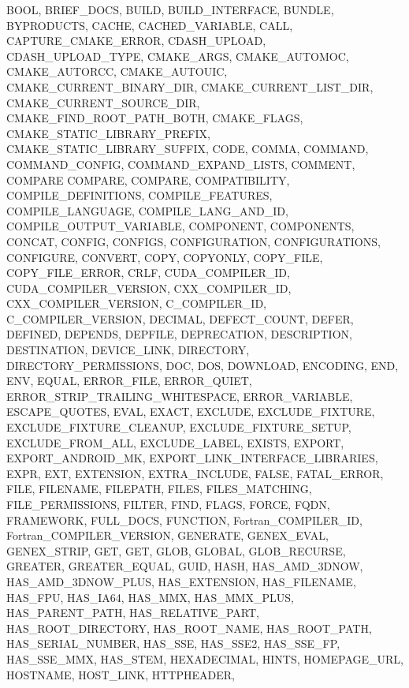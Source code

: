 {{    BOOL,
    BRIEF_DOCS,
    BUILD,
    BUILD_INTERFACE,
    BUNDLE,
    BYPRODUCTS,
    CACHE,
    CACHED_VARIABLE,
    CALL,
    CAPTURE_CMAKE_ERROR,
    CDASH_UPLOAD,
    CDASH_UPLOAD_TYPE,
    CMAKE_ARGS,
    CMAKE_AUTOMOC,
    CMAKE_AUTORCC,
    CMAKE_AUTOUIC,
    CMAKE_CURRENT_BINARY_DIR,
    CMAKE_CURRENT_LIST_DIR,
    CMAKE_CURRENT_SOURCE_DIR,
    CMAKE_FIND_ROOT_PATH_BOTH,
    CMAKE_FLAGS,
    CMAKE_STATIC_LIBRARY_PREFIX,
    CMAKE_STATIC_LIBRARY_SUFFIX,
    CODE,
    COMMA,
    COMMAND,
    COMMAND_CONFIG,
    COMMAND_EXPAND_LISTS,
    COMMENT,
    COMPARE
    COMPARE,
    COMPARE,
    COMPATIBILITY,
    COMPILE_DEFINITIONS,
    COMPILE_FEATURES,
    COMPILE_LANGUAGE,
    COMPILE_LANG_AND_ID,
    COMPILE_OUTPUT_VARIABLE,
    COMPONENT,
    COMPONENTS,
    CONCAT,
    CONFIG,
    CONFIGS,
    CONFIGURATION,
    CONFIGURATIONS,
    CONFIGURE,
    CONVERT,
    COPY,
    COPYONLY,
    COPY_FILE,
    COPY_FILE_ERROR,
    CRLF,
    CUDA_COMPILER_ID,
    CUDA_COMPILER_VERSION,
    CXX_COMPILER_ID,
    CXX_COMPILER_VERSION,
    C_COMPILER_ID,
    C_COMPILER_VERSION,
    DECIMAL,
    DEFECT_COUNT,
    DEFER,
    DEFINED,
    DEPENDS,
    DEPFILE,
    DEPRECATION,
    DESCRIPTION,
    DESTINATION,
    DEVICE_LINK,
    DIRECTORY,
    DIRECTORY_PERMISSIONS,
    DOC,
    DOS,
    DOWNLOAD,
    ENCODING,
    END,
    ENV,
    EQUAL,
    ERROR_FILE,
    ERROR_QUIET,
    ERROR_STRIP_TRAILING_WHITESPACE,
    ERROR_VARIABLE,
    ESCAPE_QUOTES,
    EVAL,
    EXACT,
    EXCLUDE,
    EXCLUDE_FIXTURE,
    EXCLUDE_FIXTURE_CLEANUP,
    EXCLUDE_FIXTURE_SETUP,
    EXCLUDE_FROM_ALL,
    EXCLUDE_LABEL,
    EXISTS,
    EXPORT,
    EXPORT_ANDROID_MK,
    EXPORT_LINK_INTERFACE_LIBRARIES,
    EXPR,
    EXT,
    EXTENSION,
    EXTRA_INCLUDE,
    FALSE,
    FATAL_ERROR,
    FILE,
    FILENAME,
    FILEPATH,
    FILES,
    FILES_MATCHING,
    FILE_PERMISSIONS,
    FILTER,
    FIND,
    FLAGS,
    FORCE,
    FQDN,
    FRAMEWORK,
    FULL_DOCS,
    FUNCTION,
    Fortran_COMPILER_ID,
    Fortran_COMPILER_VERSION,
    GENERATE,
    GENEX_EVAL,
    GENEX_STRIP,
    GET,
    GET,
    GLOB,
    GLOBAL,
    GLOB_RECURSE,
    GREATER,
    GREATER_EQUAL,
    GUID,
    HASH,
    HAS_AMD_3DNOW,
    HAS_AMD_3DNOW_PLUS,
    HAS_EXTENSION,
    HAS_FILENAME,
    HAS_FPU,
    HAS_IA64,
    HAS_MMX,
    HAS_MMX_PLUS,
    HAS_PARENT_PATH,
    HAS_RELATIVE_PART,
    HAS_ROOT_DIRECTORY,
    HAS_ROOT_NAME,
    HAS_ROOT_PATH,
    HAS_SERIAL_NUMBER,
    HAS_SSE,
    HAS_SSE2,
    HAS_SSE_FP,
    HAS_SSE_MMX,
    HAS_STEM,
    HEXADECIMAL,
    HINTS,
    HOMEPAGE_URL,
    HOSTNAME,
    HOST_LINK,
    HTTPHEADER,
}}
